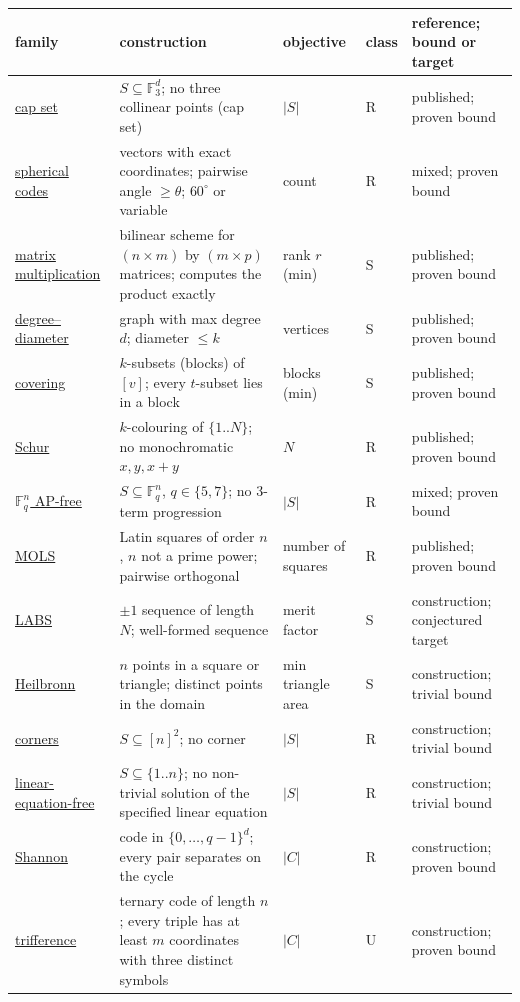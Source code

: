 \begin{tabularx}{\linewidth}{@{}P{.16\linewidth}YP{.12\linewidth}P{.09\linewidth}P{.22\linewidth}@{}}
\toprule
family & construction & objective & class & reference; bound or target \\
\midrule
\hyperref[family:capset]{cap set} & $S \subseteq \mathbb{F}_3^d$; no three collinear points (cap set) & $|S|$ & R & published; proven bound \\
\hyperref[family:spherical_code]{spherical codes} & vectors with exact coordinates; pairwise angle $\ge\theta$; $60^\circ$ or variable & count & R & mixed; proven bound \\
\hyperref[family:matmul]{matrix multiplication} & bilinear scheme for $(n\times m)$ by $(m\times p)$ matrices; computes the product exactly & rank $r$ (min) & S & published; proven bound \\
\hyperref[family:degdiam]{degree--diameter} & graph with max degree $d$; diameter $\le k$ & vertices & S & published; proven bound \\
\hyperref[family:covering]{covering} & $k$-subsets (blocks) of $[v]$; every $t$-subset lies in a block & blocks (min) & S & published; proven bound \\
\hyperref[family:schur]{Schur} & $k$-colouring of $\{1..N\}$; no monochromatic $x, y, x{+}y$ & $N$ & R & published; proven bound \\
\hyperref[family:apfree_q]{$\mathbb{F}_q^n$ AP-free} & $S \subseteq \mathbb{F}_q^n$, $q\in\{5,7\}$; no 3-term progression & $|S|$ & R & mixed; proven bound \\
\hyperref[family:mols]{MOLS} & Latin squares of order $n$, $n$ not a prime power; pairwise orthogonal & number of squares & R & published; proven bound \\
\midrule
\hyperref[family:labs]{LABS} & $\pm1$ sequence of length $N$; well-formed sequence & merit factor & S & construction; conjectured target \\
\hyperref[family:heilbronn]{Heilbronn} & $n$ points in a square or triangle; distinct points in the domain & min triangle area & S & construction; trivial bound \\
\hyperref[family:corners]{corners} & $S \subseteq [n]^2$; no corner & $|S|$ & R & construction; trivial bound \\
\hyperref[family:lineq]{linear-equation-free} & $S \subseteq \{1..n\}$; no non-trivial solution of the specified linear equation & $|S|$ & R & construction; trivial bound \\
\hyperref[family:shannon]{Shannon} & code in $\{0,\ldots,q-1\}^d$; every pair separates on the cycle & $|C|$ & R & construction; proven bound \\
\hyperref[family:trifference]{trifference} & ternary code of length $n$; every triple has at least $m$ coordinates with three distinct symbols & $|C|$ & U & construction; proven bound \\
\bottomrule
\end{tabularx}
